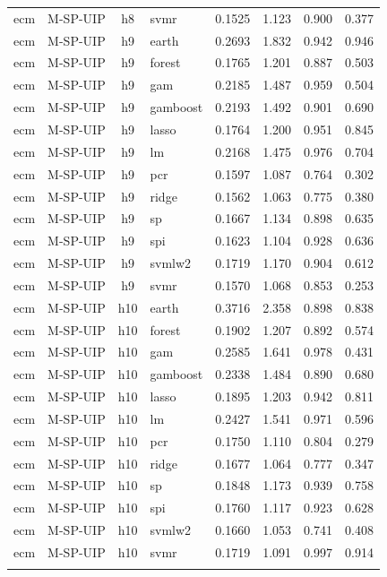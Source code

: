 \begin{ThreePartTable}
\begin{longtable}[t]{llclcccc}
ecm & M-SP-UIP & h8 & svmr & 0.1525 & 1.123 & 0.900 & 0.377\\
\addlinespace
ecm & M-SP-UIP & h9 & earth & 0.2693 & 1.832 & 0.942 & 0.946\\
ecm & M-SP-UIP & h9 & forest & 0.1765 & 1.201 & 0.887 & 0.503\\
ecm & M-SP-UIP & h9 & gam & 0.2185 & 1.487 & 0.959 & 0.504\\
ecm & M-SP-UIP & h9 & gamboost & 0.2193 & 1.492 & 0.901 & 0.690\\
ecm & M-SP-UIP & h9 & lasso & 0.1764 & 1.200 & 0.951 & 0.845\\
ecm & M-SP-UIP & h9 & lm & 0.2168 & 1.475 & 0.976 & 0.704\\
ecm & M-SP-UIP & h9 & pcr & 0.1597 & 1.087 & 0.764 & 0.302\\
ecm & M-SP-UIP & h9 & ridge & 0.1562 & 1.063 & 0.775 & 0.380\\
ecm & M-SP-UIP & h9 & sp & 0.1667 & 1.134 & 0.898 & 0.635\\
ecm & M-SP-UIP & h9 & spi & 0.1623 & 1.104 & 0.928 & 0.636\\
ecm & M-SP-UIP & h9 & svmlw2 & 0.1719 & 1.170 & 0.904 & 0.612\\
ecm & M-SP-UIP & h9 & svmr & 0.1570 & 1.068 & 0.853 & 0.253\\
\addlinespace
ecm & M-SP-UIP & h10 & earth & 0.3716 & 2.358 & 0.898 & 0.838\\
ecm & M-SP-UIP & h10 & forest & 0.1902 & 1.207 & 0.892 & 0.574\\
ecm & M-SP-UIP & h10 & gam & 0.2585 & 1.641 & 0.978 & 0.431\\
ecm & M-SP-UIP & h10 & gamboost & 0.2338 & 1.484 & 0.890 & 0.680\\
ecm & M-SP-UIP & h10 & lasso & 0.1895 & 1.203 & 0.942 & 0.811\\
ecm & M-SP-UIP & h10 & lm & 0.2427 & 1.541 & 0.971 & 0.596\\
ecm & M-SP-UIP & h10 & pcr & 0.1750 & 1.110 & 0.804 & 0.279\\
ecm & M-SP-UIP & h10 & ridge & 0.1677 & 1.064 & 0.777 & 0.347\\
ecm & M-SP-UIP & h10 & sp & 0.1848 & 1.173 & 0.939 & 0.758\\
ecm & M-SP-UIP & h10 & spi & 0.1760 & 1.117 & 0.923 & 0.628\\
ecm & M-SP-UIP & h10 & svmlw2 & 0.1660 & 1.053 & 0.741 & 0.408\\
ecm & M-SP-UIP & h10 & svmr & 0.1719 & 1.091 & 0.997 & 0.914\\
\addlinespace

\end{longtable}
\end{ThreePartTable}
